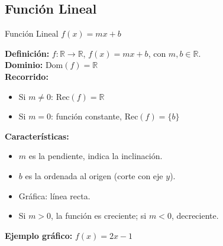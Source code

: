 \documentclass[12pt,a4paper]{article}
\newcommand{\Dominio}{\ensuremath{\mathrm{Dom}}}
\newcommand{\Recorrido}{\ensuremath{\mathrm{Rec}}}
\begin{document}
\subsection{Función Lineal}
\begin{funcbox}{Función Lineal $f(x)=mx+b$}
\begin{minipage}[t]{0.55\textwidth}
    \textbf{Definición:} $f:\mathbb{R}\to\mathbb{R}$, $f(x)=mx+b$, con $m,b\in\mathbb{R}$.\\
    \textbf{Dominio:} $\Dominio(f)=\mathbb{R}$\\
    \textbf{Recorrido:} 
    \begin{itemize}
        \item Si $m\neq 0$: $\Recorrido(f)=\mathbb{R}$
        \item Si $m=0$: función constante, $\Recorrido(f)=\{b\}$
    \end{itemize}
    \textbf{Características:}
    \begin{itemize}
        \item $m$ es la pendiente, indica la inclinación.
        \item $b$ es la ordenada al origen (corte con eje $y$).
        \item Gráfica: línea recta.
        \item Si $m>0$, la función es creciente; si $m<0$, decreciente.
    \end{itemize}
    \textbf{Ejemplo gráfico:} $f(x)=2x-1$
\end{minipage}\hfill
\begin{minipage}[t]{0.4\textwidth}
    \centering
\end{minipage}
\end{funcbox}

\end{document}
